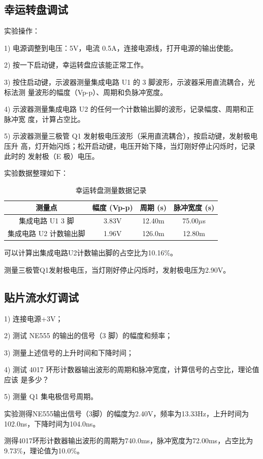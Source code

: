 \documentclass[12pt,a4paper]{article}
\begin{document}
\subsection{幸运转盘调试}
实验操作：

1) 电源调整到电压：5V，电流 0.5A，连接电源线，打开电源的输出使能。

2) 按一下启动键，幸运转盘应该能正常工作。

3) 按住启动键，示波器测量集成电路 U1 的 3 脚波形，示波器采用直流耦合，光标法测
量波形的幅度（Vp-p）、周期和负脉冲宽度。

4) 示波器测量集成电路 U2 的任何一个计数输出脚的波形，记录幅度、周期和正脉冲宽
度，计算占空比。

5) 示波器测量三极管 Q1 发射极电压波形（采用直流耦合），按启动键，发射极电压升
高，灯开始闪烁；松开启动键，电压开始下降，当灯刚好停止闪烁时，记录此时的
发射极（E 极）电压。

实验数据整理如下：
\begin{table}[H]
    \centering
    \begin{tabular}{|c|c|c|c|}
        \hline
        测量点 & 幅度 (Vp-p) & 周期 (s) & 脉冲宽度 (s)   \\ \hline
        集成电路 U1 3 脚 & 3.83V       & 12.40m & 75.00$\mu$s   \\ \hline
        集成电路 U2 计数输出脚 & 1.96V       & 126.0m & 12.80m  \\ \hline
    \end{tabular}
    \caption{幸运转盘测量数据记录}
    \label{tab:luck_wheel_measurements}
\end{table}
可以计算出集成电路U2计数输出脚的占空比为10.16\%。

测量三极管Q1发射极电压，当灯刚好停止闪烁时，发射极电压为2.90V。
\subsection{贴片流水灯调试}

1) 连接电源+3V；

2) 测试 NE555 的输出的信号（3 脚）的幅度和频率；

3) 测量上述信号的上升时间和下降时间；

4) 测试 4017 环形计数器输出波形的周期和脉冲宽度，计算信号的占空比，理论值应该
是多少？

5) 测量 Q1 集电极信号周期。

实验测得NE555输出信号（3脚）的幅度为2.40V，频率为13.33Hz，上升时间为102.0ns，下降时间为104.0ns。

测得4017环形计数器输出波形的周期为740.0ms，脉冲宽度为72.00ms，占空比为9.73\%，理论值为10.0\%。
\end{document}

